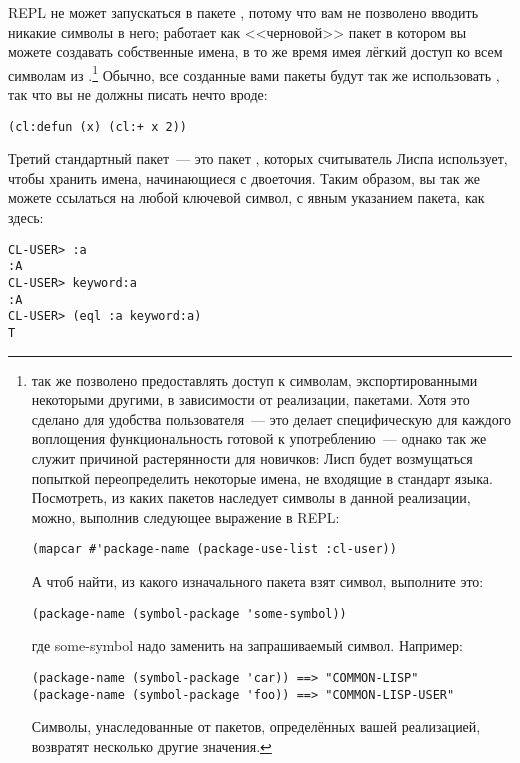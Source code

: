 REPL не может запускаться в пакете , потому что вам не позволено вводить
никакие символы в него;  работает как <<черновой>> пакет в котором вы
можете создавать собственные имена, в то же время имея лёгкий доступ ко всем символам из
.\footnote{ так же позволено предоставлять доступ
  к символам, экспортированными некоторыми другими, в зависимости от реализации,
  пакетами. Хотя это сделано для удобства пользователя~--- это делает специфическую для
  каждого воплощения функциональность готовой к употреблению~--- однако так же служит
  причиной растерянности для новичков: Лисп будет возмущаться попыткой переопределить
  некоторые имена, не входящие в стандарт языка. Посмотреть, из каких пакетов
   наследует символы в данной реализации, можно, выполнив следующее
  выражение в REPL:

\begin{lstlisting}
(mapcar #'package-name (package-use-list :cl-user))
\end{lstlisting}

А чтоб найти, из какого изначального пакета взят символ, выполните это:

\begin{lstlisting}
(package-name (symbol-package 'some-symbol))
\end{lstlisting}

где some-symbol надо заменить на запрашиваемый символ. Например:

\begin{lstlisting}
(package-name (symbol-package 'car)) ==> "COMMON-LISP"
(package-name (symbol-package 'foo)) ==> "COMMON-LISP-USER"
\end{lstlisting}

Символы, унаследованные от пакетов, определённых вашей реализацией, возвратят несколько
другие значения.} Обычно, все созданные вами пакеты будут так же использовать
, так что вы не должны писать нечто вроде:

\begin{lstlisting}
(cl:defun (x) (cl:+ x 2))
\end{lstlisting}

Третий стандартный пакет~--- это пакет , которых считыватель Лиспа
использует, чтобы хранить имена, начинающиеся с двоеточия. Таким образом, вы так же можете
ссылаться на любой ключевой символ, с явным указанием пакета, как здесь:

\begin{lstlisting}
CL-USER> :a
:A
CL-USER> keyword:a
:A
CL-USER> (eql :a keyword:a)
T
\end{lstlisting}

